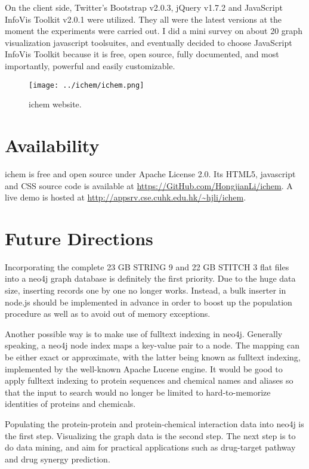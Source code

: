\documentclass[10pt,conference,compsocconf]{IEEEtran}
\begin{document}
On the client side, Twitter's Bootstrap v2.0.3, jQuery v1.7.2 and JavaScript InfoVis Toolkit v2.0.1 were utilized. They all were the latest versions at the moment the experiments were carried out. I did a mini survey on about 20 graph visualization javascript toolsuites, and eventually decided to choose JavaScript InfoVis Toolkit because it is free, open source, fully documented, and most importantly, powerful and easily customizable.

\begin{figure*}
\centering
\texttt{[image: ../ichem/ichem.png]}
\caption{ichem website.}
\label{fig:ichem}
\end{figure*}

\section{Availability}

ichem is free and open source under Apache License 2.0. Its HTML5, javascript and CSS source code is available at \url{https://GitHub.com/HongjianLi/ichem}. A live demo is hosted at \url{http://appsrv.cse.cuhk.edu.hk/~hjli/ichem}.

\section{Future Directions}

Incorporating the complete 23 GB STRING 9 and 22 GB STITCH 3 flat files into a neo4j graph database is definitely the first priority. Due to the huge data size, inserting records one by one no longer works. Instead, a bulk inserter in node.js should be implemented in advance in order to boost up the population procedure as well as to avoid out of memory exceptions.

Another possible way is to make use of fulltext indexing in neo4j. Generally speaking, a neo4j node index maps a key-value pair to a node. The mapping can be either exact or approximate, with the latter being known as fulltext indexing, implemented by the well-known Apache Lucene engine. It would be good to apply fulltext indexing to protein sequences and chemical names and aliases so that the input to search would no longer be limited to hard-to-memorize identities of proteins and chemicals.

Populating the protein-protein and protein-chemical interaction data into neo4j is the first step. Visualizing the graph data is the second step. The next step is to do data mining, and aim for practical applications such as drug-target pathway and drug synergy prediction.
\end{document}
